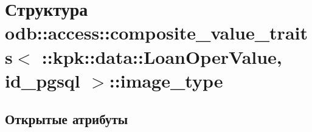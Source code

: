 \hypertarget{structodb_1_1access_1_1composite__value__traits_3_01_1_1kpk_1_1data_1_1_loan_oper_value_00_01id__pgsql_01_4_1_1image__type}{}\section{Структура odb\+:\+:access\+:\+:composite\+\_\+value\+\_\+traits$<$ \+:\+:kpk\+:\+:data\+:\+:Loan\+Oper\+Value, id\+\_\+pgsql $>$\+:\+:image\+\_\+type}
\label{structodb_1_1access_1_1composite__value__traits_3_01_1_1kpk_1_1data_1_1_loan_oper_value_00_01id__pgsql_01_4_1_1image__type}
\subsection*{Открытые атрибуты}

